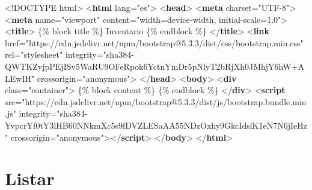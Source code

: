 \documentclass[
  a4paper,
  DIV=11,
  numbers=noendperiod,
  onepage,
  openany]{scrreprt}
\newenvironment{Shaded}{\begin{snugshade}}{\end{snugshade}}
\newcommand{\DataTypeTok}[1]{\textcolor[rgb]{0.68,0.00,0.00}{#1}}
\newcommand{\KeywordTok}[1]{\textcolor[rgb]{0.00,0.23,0.31}{\textbf{#1}}}
\newcommand{\NormalTok}[1]{\textcolor[rgb]{0.00,0.23,0.31}{#1}}
\newcommand{\OperatorTok}[1]{\textcolor[rgb]{0.37,0.37,0.37}{#1}}
\newcommand{\OtherTok}[1]{\textcolor[rgb]{0.00,0.23,0.31}{#1}}
\newcommand{\StringTok}[1]{\textcolor[rgb]{0.13,0.47,0.30}{#1}}
\begin{document}
\begin{tcolorbox}
\begin{Shaded}
\begin{Highlighting}[]
\DataTypeTok{\textless{}!DOCTYPE}\NormalTok{ html}\DataTypeTok{\textgreater{}}
\DataTypeTok{\textless{}}\KeywordTok{html}\OtherTok{ lang}\OperatorTok{=}\StringTok{"es"}\DataTypeTok{\textgreater{}}
\DataTypeTok{\textless{}}\KeywordTok{head}\DataTypeTok{\textgreater{}}
    \DataTypeTok{\textless{}}\KeywordTok{meta}\OtherTok{ charset}\OperatorTok{=}\StringTok{"UTF{-}8"}\DataTypeTok{\textgreater{}}
    \DataTypeTok{\textless{}}\KeywordTok{meta}\OtherTok{ name}\OperatorTok{=}\StringTok{"viewport"}\OtherTok{ content}\OperatorTok{=}\StringTok{"width=device{-}width, initial{-}scale=1.0"}\DataTypeTok{\textgreater{}}
    \DataTypeTok{\textless{}}\KeywordTok{title}\DataTypeTok{\textgreater{}}
\NormalTok{        \{\% block title \%\}}
\NormalTok{        Inventario}
\NormalTok{        \{\% endblock \%\}}
    \DataTypeTok{\textless{}/}\KeywordTok{title}\DataTypeTok{\textgreater{}}
    \DataTypeTok{\textless{}}\KeywordTok{link}\OtherTok{ href}\OperatorTok{=}\StringTok{"https://cdn.jsdelivr.net/npm/bootstrap@5.3.3/dist/css/bootstrap.min.css"}\OtherTok{ rel}\OperatorTok{=}\StringTok{"stylesheet"}\OtherTok{ integrity}\OperatorTok{=}\StringTok{"sha384{-}QWTKZyjpPEjISv5WaRU9OFeRpok6YctnYmDr5pNlyT2bRjXh0JMhjY6hW+ALEwIH"}\OtherTok{ crossorigin}\OperatorTok{=}\StringTok{"anonymous"}\DataTypeTok{\textgreater{}}
\DataTypeTok{\textless{}/}\KeywordTok{head}\DataTypeTok{\textgreater{}}
\DataTypeTok{\textless{}}\KeywordTok{body}\DataTypeTok{\textgreater{}}
    \DataTypeTok{\textless{}}\KeywordTok{div}\OtherTok{ class}\OperatorTok{=}\StringTok{"container"}\DataTypeTok{\textgreater{}}
\NormalTok{        \{\% block content \%\} }
\NormalTok{        \{\% endblock \%\}}
    \DataTypeTok{\textless{}/}\KeywordTok{div}\DataTypeTok{\textgreater{}}
\DataTypeTok{\textless{}}\KeywordTok{script}\OtherTok{ src}\OperatorTok{=}\StringTok{"https://cdn.jsdelivr.net/npm/bootstrap@5.3.3/dist/js/bootstrap.bundle.min.js"}\OtherTok{ integrity}\OperatorTok{=}\StringTok{"sha384{-}YvpcrYf0tY3lHB60NNkmXc5s9fDVZLESaAA55NDzOxhy9GkcIdslK1eN7N6jIeHz"}\OtherTok{ crossorigin}\OperatorTok{=}\StringTok{"anonymous"}\DataTypeTok{\textgreater{}\textless{}/}\KeywordTok{script}\DataTypeTok{\textgreater{}}
\DataTypeTok{\textless{}/}\KeywordTok{body}\DataTypeTok{\textgreater{}}
\DataTypeTok{\textless{}/}\KeywordTok{html}\DataTypeTok{\textgreater{}}
\end{Highlighting}
\end{Shaded}

\section{Listar}\label{listar}


\end{tcolorbox}
\end{document}
